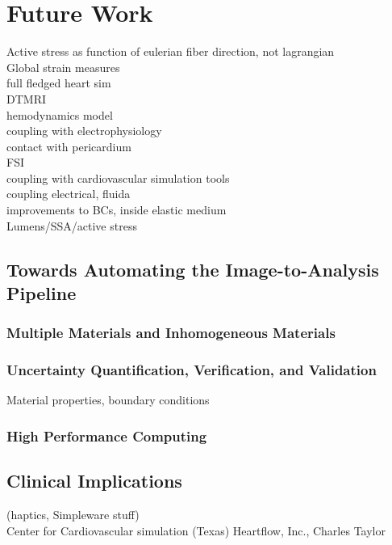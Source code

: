 \chapter{Future Work}


Active stress as function of eulerian fiber direction, not lagrangian \\
Global strain measures \\
full fledged heart sim \\
DTMRI \\
hemodynamics model \\
coupling with electrophysiology \\
contact with pericardium \\
FSI \\
coupling with cardiovascular simulation tools \\
coupling electrical, fluida \\
improvements to BCs, inside elastic medium \\
Lumens/SSA/active stress \\

\section{Towards Automating the Image-to-Analysis Pipeline}
\label{Towards Automating the Image-to-Analysis Pipeline}
\subsection{Multiple Materials and Inhomogeneous Materials}
\label{Multiple Materials and Inhomogeneous Materials}
\subsection{Uncertainty Quantification, Verification, and Validation}
\label{Uncertainty Quantification, Verification, and Validation}
Material properties, boundary conditions
\subsection{High Performance Computing}
\label{High Performance Computing}
\section{Clinical Implications}
\label{Clinical Implications}
(haptics, Simpleware stuff)\\
Center for Cardiovascular simulation (Texas)
Heartflow, Inc., Charles Taylor

